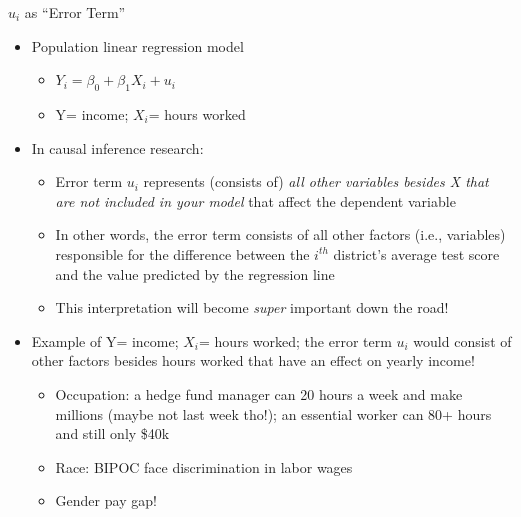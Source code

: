 \documentclass[
  8pt,
  ignorenonframetext,
  dvipsnames]{beamer}
\providecommand{\tightlist}{%
  \setlength{\itemsep}{0pt}\setlength{\parskip}{0pt}}
\let\olditem\item
\renewcommand{\item}{%
  \olditem\vspace{4pt}
}
\begin{document}
\begin{frame}{\(u_i\) as ``Error Term''}
\protect\hypertarget{u_i-as-error-term}{}

\begin{itemize}
\tightlist
\item
  Population linear regression model

  \begin{itemize}
  \tightlist
  \item
    \(Y_i = \beta_0 + \beta_1X_i + u_i\)
  \item
    Y= income; \(X_i\)= hours worked
  \end{itemize}
\end{itemize}

\medskip

\begin{itemize}
\tightlist
\item
  In causal inference research:

  \begin{itemize}
  \tightlist
  \item
    Error term \(u_i\) represents (consists of) \emph{all other
    variables besides X that are not included in your model} that affect
    the dependent variable
  \item
    In other words, the error term consists of all other factors (i.e.,
    variables) responsible for the difference between the \(i^{th}\)
    district's average test score and the value predicted by the
    regression line
  \item
    This interpretation will become \emph{super} important down the
    road!
  \end{itemize}
\end{itemize}

\medskip

\begin{itemize}
\tightlist
\item
  Example of Y= income; \(X_i\)= hours worked; the error term \(u_i\)
  would consist of other factors besides hours worked that have an
  effect on yearly income!

  \begin{itemize}
  \tightlist
  \item
    Occupation: a hedge fund manager can 20 hours a week and make
    millions (maybe not last week tho!); an essential worker can 80+
    hours and still only \$40k
  \item
    Race: BIPOC face discrimination in labor wages
  \item
    Gender pay gap!
  \end{itemize}
\end{itemize}


\end{frame}
\end{document}
